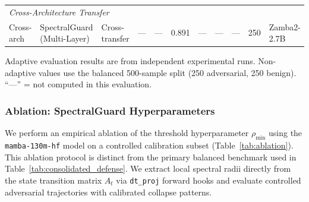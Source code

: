 \documentclass[10pt,twocolumn]{article}
\begin{document}
\begin{table}[t]
{\begin{tabular}{@{}lllcccccccl@{}}
\midrule
\multicolumn{11}{l}{\emph{Cross-Architecture Transfer}} \\
Cross-arch & SpectralGuard (Multi-Layer) & Cross-transfer & --- & --- & 0.891 & --- & --- & --- & 250 & Zamba2-2.7B \\
\bottomrule
\end{tabular}%
}
\vspace{2pt}
\begin{minipage}{0.98\textwidth}
{\footnotesize Adaptive evaluation results are from independent experimental runs. Non-adaptive values use the balanced 500-sample split (250 adversarial, 250 benign). ``---'' = not computed in this evaluation.} %
\end{minipage}
\end{table}

\subsubsection{Ablation: SpectralGuard Hyperparameters}

We perform an empirical ablation of the threshold hyperparameter $\rho_{\min}$ using the \texttt{mamba-130m-hf} model on a controlled calibration subset (Table~\ref{tab:ablation}). This ablation protocol is distinct from the primary balanced benchmark used in Table~\ref{tab:consolidated_defense}. We extract local spectral radii directly from the state transition matrix $A_t$ via \texttt{dt\_proj} forward hooks and evaluate controlled adversarial trajectories with calibrated collapse patterns.

\begin{table}[t]
\centering
\caption{\textbf{Empirical Threshold Ablation (Mamba-130M, controlled subset).} Performance metrics for varying detection thresholds $\rho_{\min}$ on a calibration protocol. These values are for sensitivity analysis and are not the headline non-adaptive benchmark.}
\label{tab:ablation}
\renewcommand{\arraystretch}{1.2}
\end{table}
\end{document}
